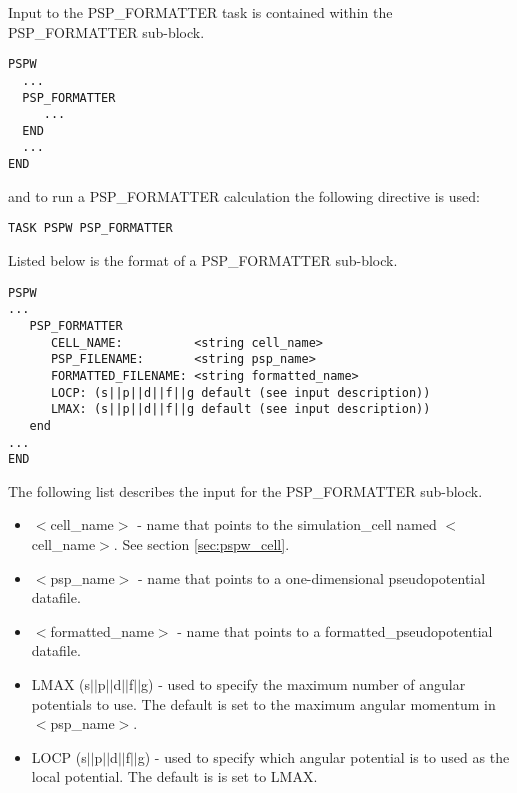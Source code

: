 Input to the PSP\_FORMATTER task is contained
within the PSP\_FORMATTER sub-block.
\begin{verbatim}
PSPW
  ...
  PSP_FORMATTER
     ...
  END
  ...
END
\end{verbatim}
and to run a PSP\_FORMATTER calculation the following directive is used:
\begin{verbatim}
TASK PSPW PSP_FORMATTER
\end{verbatim}
Listed below is the format of a PSP\_FORMATTER sub-block.
\begin{verbatim}
PSPW
... 
   PSP_FORMATTER
      CELL_NAME:          <string cell_name> 
      PSP_FILENAME:       <string psp_name>
      FORMATTED_FILENAME: <string formatted_name>
      LOCP: (s||p||d||f||g default (see input description))
      LMAX: (s||p||d||f||g default (see input description))
   end
...
END
\end{verbatim}
The following list describes the input for the PSP\_FORMATTER
sub-block.
\begin{itemize}
	\item $<$cell\_name$>$ - name that points 
		to the simulation\_cell named $<$cell\_name$>$.  See section \ref{sec:pspw_cell}.
	\item $<$psp\_name$>$ - name that points
              to a one-dimensional pseudopotential datafile.
	\item $<$formatted\_name$>$ -  
 	      name that points to a formatted\_pseudopotential datafile.
        \item LMAX (s$||$p$||$d$||$f$||$g) - used to specify the maximum number
              of angular potentials to use. The default is set to the maximum
              angular momentum in $<$psp\_name$>$.
        \item LOCP (s$||$p$||$d$||$f$||$g) - used to specify which angular potential
	      is to used as the local potential.  The default is is set to LMAX.
\end{itemize}




